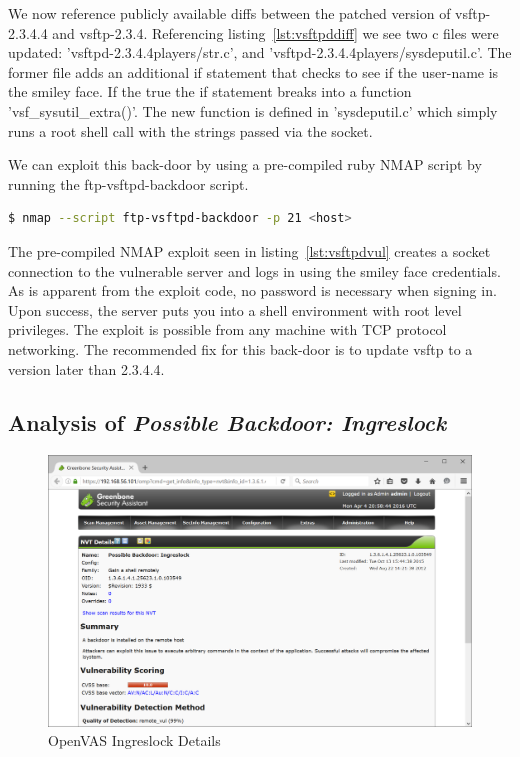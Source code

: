 \documentclass[12pt]{article}
\begin{document}
We now reference publicly available diffs between the patched version of 
vsftp-2.3.4.4 and vsftp-2.3.4. Referencing listing~\ref{lst:vsftpddiff}
we see two c files were updated: 'vsftpd-2.3.4.4players/str.c', and 
'vsftpd-2.3.4.4players/sysdeputil.c'.  The former file adds an additional
if statement that checks to see if the user-name is the smiley face. If
the true the if statement breaks into a function 'vsf\_sysutil\_extra()'. 
The new function is defined in 'sysdeputil.c' which simply runs a root
shell call with the strings passed via the socket. 

We can exploit this back-door by using a pre-compiled ruby NMAP script by 
running the ftp-vsftpd-backdoor script. 

\begin{lstlisting}[language=bash]
    $ nmap --script ftp-vsftpd-backdoor -p 21 <host>
\end{lstlisting}

The pre-compiled NMAP exploit seen in listing~\ref{lst:vsftpdvul} creates 
a socket connection to the vulnerable server and logs in using the smiley 
face credentials. As is apparent from the exploit code, no password is 
necessary when signing in. Upon success, the server puts you into a shell
environment with root level privileges. The exploit is possible from
any machine with TCP protocol networking. The recommended fix for this
back-door is to update vsftp to a version later than 2.3.4.4.

\subsection{Analysis of \textit{Possible Backdoor: Ingreslock}}
\label{sec:vul2}

\begin{figure}[H]
    \centering
    \includegraphics[width=5.5in]{images/20160403-ingerslock.PNG}
    \caption{OpenVAS Ingreslock Details}
    \label{fig:ingres}
\end{figure}
\end{document}
